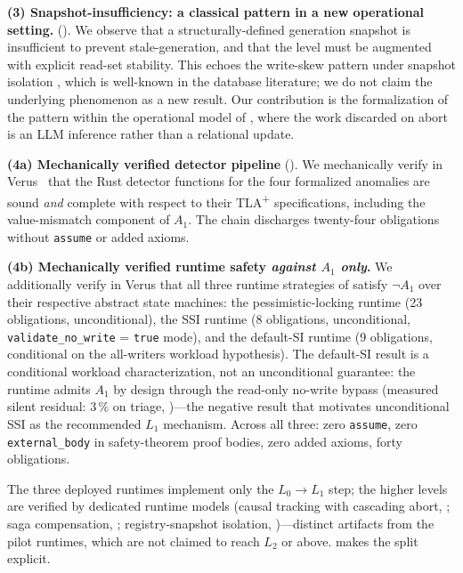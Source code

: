 \documentclass[journal,compsoc,10pt]{IEEEtran}
\providecommand{\citep}{\cite}
\theoremstyle{definition}
\theoremstyle{remark}
\begin{document}
\medskip
\noindent\textbf{(3) Snapshot-insufficiency: a classical pattern
in a new operational setting.}
(). We observe that a
structurally-defined generation snapshot is insufficient to
prevent stale-generation, and that the level must be augmented
with explicit read-set stability. This echoes the
write-skew pattern under snapshot isolation
\citep{BerensonEtAl1995, CahillRohmFekete2008SSI, FeketeEtAl2005MakingSI},
which is well-known in the database literature; we do not claim
the underlying phenomenon as a new result. Our contribution is
the formalization of the pattern within the operational model of
, where the work discarded on abort is an LLM
inference rather than a relational update.

\medskip
\noindent\textbf{(4a) Mechanically verified detector pipeline}
(). We mechanically verify in
Verus~\cite{Lattuada2023Verus} that the Rust detector functions
for the four formalized anomalies are sound \emph{and} complete
with respect to their TLA\textsuperscript{+} specifications,
including the value-mismatch component of $A_1$. The chain
discharges twenty-four obligations without \texttt{assume} or
added axioms.

\medskip
\noindent\textbf{(4b) Mechanically verified runtime safety \emph{against $A_1$ only}.}
We additionally verify in Verus that all three runtime
strategies of  satisfy $\neg A_1$ over
their respective abstract state machines:
the pessimistic-locking runtime (23 obligations,
unconditional), the SSI runtime (8 obligations, unconditional,
\texttt{validate\_no\_write} = \texttt{true} mode), and the
default-SI runtime (9 obligations, conditional on the
all-writers workload hypothesis). The default-SI result is a conditional workload
characterization, not an unconditional guarantee: the runtime admits
$A_1$ by design through the read-only no-write bypass (measured silent
residual: $3\,\%$ on triage, )---the negative result
that motivates unconditional SSI as the recommended $L_1$ mechanism.
Across all three: zero \texttt{assume}, zero \texttt{external\_body} in
safety-theorem proof bodies, zero added axioms, forty obligations.

\noindent
The three deployed runtimes implement only the $L_0 \to L_1$ step; the
higher levels are verified by dedicated runtime models (causal tracking
with cascading abort, ; saga compensation,
; registry-snapshot isolation,
)---distinct artifacts from the pilot runtimes,
which are not claimed to reach $L_2$ or above.
 makes the split explicit.
\end{document}
